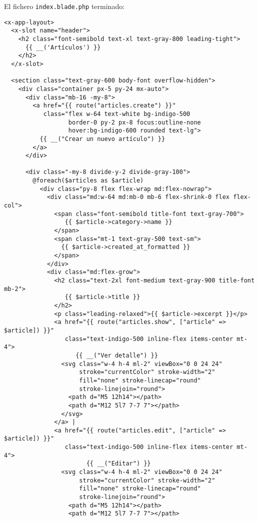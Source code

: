 \documentclass[11pt]{article}
\begin{document}
El fichero \texttt{index.blade.php} terminado:
\begin{verbatim}
<x-app-layout>
  <x-slot name="header">
    <h2 class="font-semibold text-xl text-gray-800 leading-tight">
      {{ __('Artículos') }}
    </h2>
  </x-slot>

  <section class="text-gray-600 body-font overflow-hidden">
    <div class="container px-5 py-24 mx-auto">
      <div class="mb-16 -my-8">
        <a href="{{ route("articles.create") }}"
           class="flex w-64 text-white bg-indigo-500
                  border-0 py-2 px-8 focus:outline-none
                  hover:bg-indigo-600 rounded text-lg">
          {{ __("Crear un nuevo artículo") }}
        </a>
      </div>

      <div class="-my-8 divide-y-2 divide-gray-100">
        @foreach($articles as $article)
          <div class="py-8 flex flex-wrap md:flex-nowrap">
            <div class="md:w-64 md:mb-0 mb-6 flex-shrink-0 flex flex-col">
              <span class="font-semibold title-font text-gray-700">
                 {{ $article->category->name }}
              </span>
              <span class="mt-1 text-gray-500 text-sm">
                {{ $article->created_at_formatted }}
              </span>
            </div>
            <div class="md:flex-grow">
              <h2 class="text-2xl font-medium text-gray-900 title-font mb-2">
                 {{ $article->title }}
              </h2>
              <p class="leading-relaxed">{{ $article->excerpt }}</p>
              <a href="{{ route("articles.show", ["article" => $article]) }}"
                 class="text-indigo-500 inline-flex items-center mt-4">
                    {{ __("Ver detalle") }}
                <svg class="w-4 h-4 ml-2" viewBox="0 0 24 24"
                     stroke="currentColor" stroke-width="2"
                     fill="none" stroke-linecap="round"
                     stroke-linejoin="round">
                  <path d="M5 12h14"></path>
                  <path d="M12 5l7 7-7 7"></path>
                </svg>
              </a> |
              <a href="{{ route("articles.edit", ["article" => $article]) }}"
                 class="text-indigo-500 inline-flex items-center mt-4">
                       {{ __("Editar") }}
                <svg class="w-4 h-4 ml-2" viewBox="0 0 24 24"
                     stroke="currentColor" stroke-width="2"
                     fill="none" stroke-linecap="round"
                     stroke-linejoin="round">
                  <path d="M5 12h14"></path>
                  <path d="M12 5l7 7-7 7"></path>

\end{verbatim}
\end{document}
